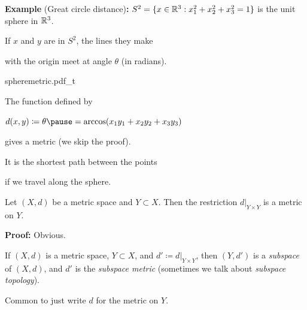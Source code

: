 \documentclass[10pt,aspectratio=169]{beamer}
\begin{document}
\begin{frame}
\textbf{Example} (Great circle distance)\textbf{:}
$S^2 = \{ x \in {\mathbb{R}}^3 : x_1^2+x_2^2+x_3^2 = 1 \}$ is the unit sphere in 
${\mathbb{R}}^3$.

\medskip
\pause

If $x$ and $y$ are in $S^2$, the lines they make

with the origin meet at angle $\theta$ (in radians).

\vspace*{-0.3in}
\hspace*{3.2in}
{spheremetric.pdf_t}

\vspace*{-0.95in}
\pause

The function defined by

\quad
$d(x,y) \coloneqq \theta \pause = \arccos(x_1y_1+x_2y_2+x_3y_3)$

gives a metric (we skip the proof).

\medskip
\pause

It is the shortest path between the points

if we travel along the sphere.
\end{frame}

\begin{frame}

\begin{proposition}
Let $(X,d)$ be a metric space and $Y \subset X$.  Then the restriction
$d|_{Y \times Y}$ is a metric on $Y$.
\end{proposition}

\pause

\textbf{Proof:} Obvious.

\bigskip

\pause
\begin{definition}
If $(X,d)$ is a metric space, $Y \subset X$, and $d' \coloneqq d|_{Y \times Y}$,
then $(Y,d')$ is a \emph{subspace} of $(X,d)$, and
$d'$ is the \emph{subspace metric} (sometimes we talk about
\emph{subspace topology}).
\end{definition}

\pause
Common to just write $d$ for the metric on $Y$.

\end{frame}
\end{document}

